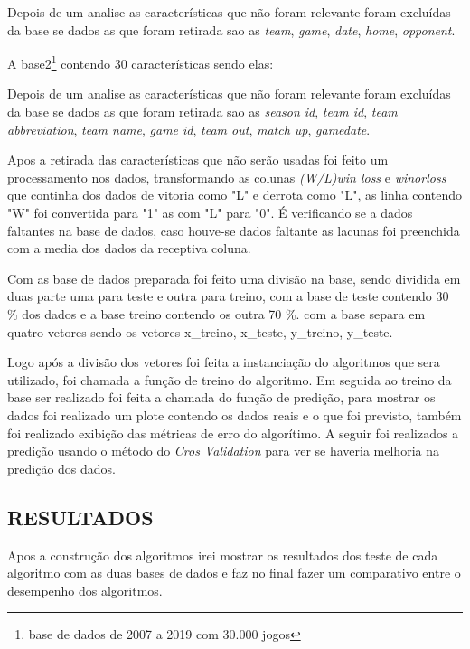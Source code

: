 Depois de um analise as características que não foram relevante foram excluídas da base se dados as que foram retirada sao as \textit{team}, \textit{game}, \textit{date}, \textit{home}, \textit{opponent}.

A base2\footnote{base de dados de 2007 a 2019 com 30.000 jogos} contendo 30 características sendo elas:
\newpage

 
 Depois de um analise as características que não foram relevante foram excluídas da base se dados as que foram retirada sao as \textit{season id}, \textit{team id}, \textit{team abbreviation}, \textit{team name}, \textit{game id}, \textit{team out}, \textit{match up}, \textit{gamedate}.

Apos a retirada das características que não serão usadas foi feito um processamento nos dados, transformando as colunas \textit{(W/L)win loss} e \textit{winorloss} que continha dos dados de vitoria como "L" e derrota como "L", as linha contendo "W" foi convertida para "1" as com "L" para "0". É verificando se a dados faltantes na base de dados, caso houve-se dados faltante  as lacunas foi preenchida com a media dos dados da receptiva coluna.

Com as base de dados preparada foi feito uma divisão na base, sendo dividida em duas parte uma para teste e outra para treino, com a base de teste contendo 30 \% dos dados e a base treino contendo os outra 70 \%. com a base separa em quatro vetores sendo os vetores x\_treino, x\_teste, y\_treino, y\_teste.

Logo após a divisão dos vetores foi feita a instanciação do algoritmos que sera utilizado, foi chamada a função de treino do algoritmo. Em seguida ao treino da base ser realizado foi feita a chamada do função de predição, para mostrar os dados foi realizado um plote contendo os dados reais e o que foi previsto, também foi realizado exibição das métricas de erro do algorítimo. A seguir foi realizados a predição usando o método do \textit{Cros Validation} para ver se haveria melhoria na predição dos dados.

\subsection{RESULTADOS} 

Apos a construção dos algoritmos irei mostrar os resultados dos teste de cada algoritmo com as duas bases de dados e faz no final fazer um comparativo entre o desempenho dos algoritmos.

